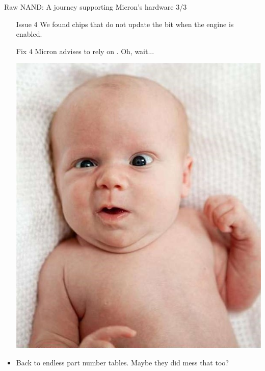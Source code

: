 \documentclass[aspectratio=169,obeyspaces,spaces,hyphens,dvipsnames]{beamer}
\begin{document}
\begin{frame}{Raw NAND: A journey supporting Micron's hardware 3/3}
  \begin{itemize}
  \item [Issue 4] We found chips that do not update the
     bit when the engine is enabled.
  \item [Fix 4] Micron advises to rely on . Oh,
    wait...
    \begin{center}
      \includegraphics[scale=0.25]{baby-confused.jpg}
    \end{center}
  \item Back to endless part number tables. Maybe they did mess that
    too?
  \end{itemize}
\end{frame}
\end{document}
